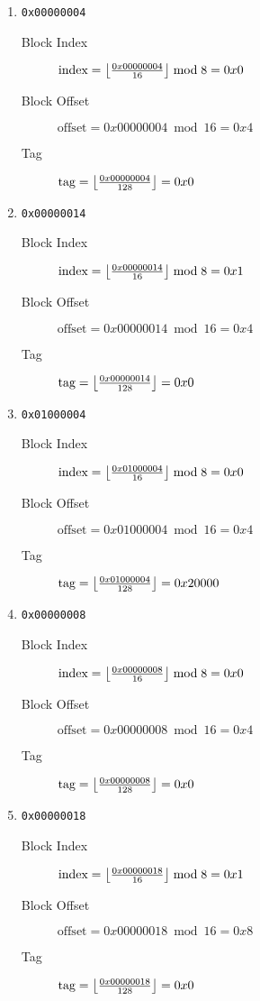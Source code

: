 \documentclass[12pt,letterpaper,titlepage]{article}
\DeclarePairedDelimiter\floor{\lfloor}{\rfloor}
\begin{document}
\begin{raggedright}
\begin{enumerate}
\begin{enumerate}
    \item \texttt{0x00000004}
    \begin{description}
    \item[Block Index] $\text{index} = \floor*{\frac{0x00000004}{16}} \bmod 8 = 0x0$ 
    \item[Block Offset] $\text{offset} = 0x00000004\bmod 16 = 0x4$ 
    \item[Tag] $\text{tag} = \floor*{\frac{0x00000004}{128}} = 0x0$ 
    \end{description}
    \item \texttt{0x00000014}
    \begin{description}
    \item[Block Index] $\text{index} = \floor*{\frac{0x00000014}{16}} \bmod 8 = 0x1$ 
    \item[Block Offset] $\text{offset} = 0x00000014\bmod 16 = 0x4$ 
    \item[Tag] $\text{tag} = \floor*{\frac{0x00000014}{128}} = 0x0$ 
    \end{description}
    \item \texttt{0x01000004}
    \begin{description}
    \item[Block Index] $\text{index} = \floor*{\frac{0x01000004}{16}} \bmod 8 = 0x0$ 
    \item[Block Offset] $\text{offset} = 0x01000004\bmod 16 = 0x4$ 
    \item[Tag] $\text{tag} = \floor*{\frac{0x01000004}{128}} = 0x20000$ 
    \end{description}
    \item \texttt{0x00000008}
    \begin{description}
    \item[Block Index] $\text{index} = \floor*{\frac{0x00000008}{16}} \bmod 8 = 0x0$ 
    \item[Block Offset] $\text{offset} = 0x00000008\bmod 16 = 0x4$ 
    \item[Tag] $\text{tag} = \floor*{\frac{0x00000008}{128}} = 0x0$ 
    \end{description}
    \item \texttt{0x00000018}
    \begin{description}
    \item[Block Index] $\text{index} = \floor*{\frac{0x00000018}{16}}\bmod 8 = 0x1$ 
    \item[Block Offset] $\text{offset} = 0x00000018\bmod 16 = 0x8$ 
    \item[Tag] $\text{tag} = \floor*{\frac{0x00000018}{128}} = 0x0$ 

\end{description}
\end{enumerate}
\end{enumerate}
\end{raggedright}
\end{document}
